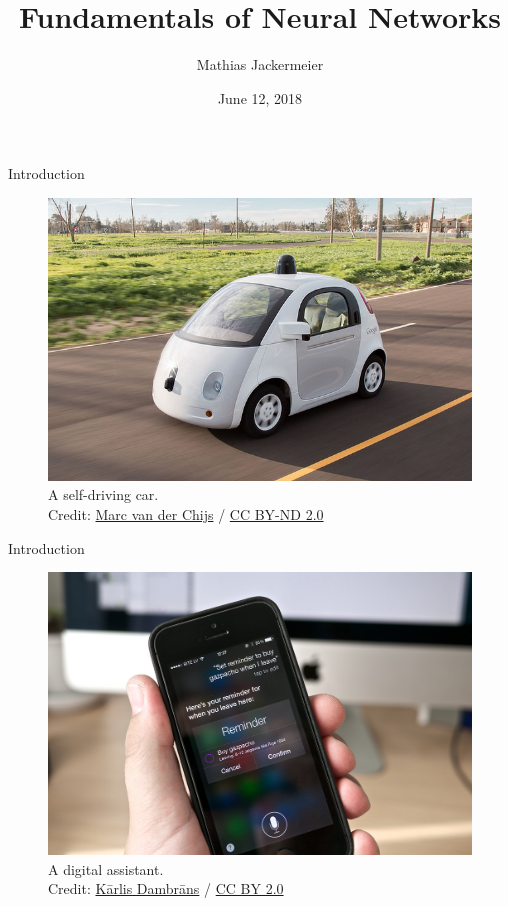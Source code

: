 \documentclass{beamer}
\title{Fundamentals of Neural Networks}
\date{June 12, 2018}
\author{Mathias Jackermeier}
\institute{Technische Universität München}
\begin{document}
	\maketitle
	\begin{frame}{Introduction}
	\begin{figure}
		\includegraphics[scale=.4]{img/self_driving}
		\caption{A self-driving car. \\Credit: 
			\href{https://www.flickr.com/photos/chijs/21798665468/in/photolist-zdgRMN-HzGNh8-gTzd3u-o5Zrtr-dLznp8-rntpFL-FnbXbs-Hap7Do-9o1FrD-GE5zz3-G9tVGQ-GhD21n-eb2sof-cDdb3y-Gfm7Po-NZGQ3J-GEawvr-FSwEH9-Fnc15o-zhGLV-GbMR1r-FnnkQp-Gfm7CG-eE2tFc-GbMRjx-GbMSe8-9mUNbt-CJdtas}{Marc van der Chijs}
			 / \href{https://creativecommons.org/licenses/by-nd/2.0/}{CC BY-ND 2.0}}
	\end{figure}
	\end{frame}
	\begin{frame}{Introduction}
		\begin{figure}
			\includegraphics[scale=.25]{img/siri}
			\caption{A digital assistant. \\Credit: 
				\href{https://www.flickr.com/photos/65265630@N03/13989720008}{Kārlis Dambrāns} / \href{https://creativecommons.org/licenses/by/2.0/}{CC BY 2.0}}
		\end{figure}
	\end{frame}
\end{document}
